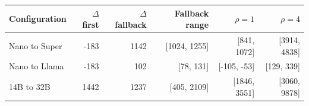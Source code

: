 \begin{tabular}{lrrrrr}
\toprule
Configuration & $\Delta$ first & $\Delta$ fallback & Fallback range & $\rho=1$ & $\rho=4$ \\
\midrule
Nano to Super & -183 & 1142 & [1024, 1255] & [841, 1072] & [3914, 4838] \\
Nano to Llama & -183 & 102 & [78, 131] & [-105, -53] & [129, 339] \\
14B to 32B & 1442 & 1237 & [405, 2109] & [1846, 3551] & [3060, 9878] \\
\bottomrule
\end{tabular}
